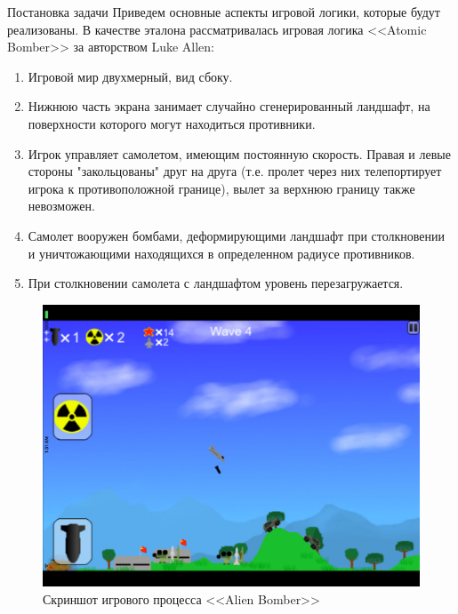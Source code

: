 \documentclass[12pt, a4paper]{article}
\begin{document}
	\begin{section}{Постановка задачи}
		Приведем основные аспекты игровой логики, которые будут реализованы.
		В качестве эталона рассматривалась игровая логика <<Atomic Bomber>> за авторством Luke Allen:

		\begin{enumerate}
			\item Игровой мир двухмерный, вид сбоку.
			\item Нижнюю часть экрана занимает случайно сгенерированный ландшафт, на поверхности которого могут находиться противники.
			\item Игрок управляет самолетом, имеющим постоянную скорость.
			Правая и левые стороны "закольцованы" друг на друга (т.е. пролет через них телепортирует игрока к противоположной границе), вылет за верхнюю границу также невозможен.
			\item Самолет вооружен бомбами, деформирующими ландшафт при столкновении и уничтожающими находящихся в определенном радиусе противников.
			\item При столкновении самолета с ландшафтом уровень перезагружается.
		\end{enumerate}

		\begin{figure}[h]
			\includegraphics[width=\linewidth]{atomic-bomber}
			\caption{Скриншот игрового процесса <<Alien Bomber>>}
		\end{figure}
	\end{section}
\end{document}
